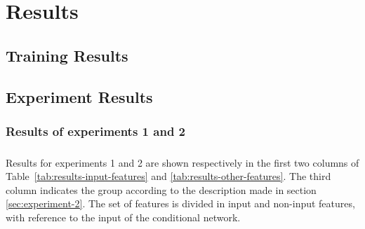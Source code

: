 \chapter{Results}
\label{sec:results}
\section{Training Results}

\section{Experiment Results}
\paragraph{}
\subsection{Results of experiments 1 and 2}
\paragraph{} Results for experiments 1 and 2 are shown respectively in the first two columns of Table~\ref{tab:results-input-features} and \ref{tab:results-other-features}. The third column indicates the group according to the description made in section \ref{sec:experiment-2}. The set of features is divided in input and non-input features, with reference to the input of the conditional network.
	
